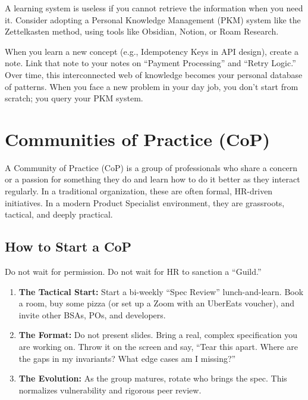 \documentclass[
  11pt,
  openany,
  oneside]{book}
\providecommand{\tightlist}{%
  \setlength{\itemsep}{0pt}\setlength{\parskip}{0pt}}
\begin{document}
A learning system is useless if you cannot retrieve the information when
you need it. Consider adopting a Personal Knowledge Management (PKM)
system like the Zettelkasten method, using tools like Obsidian, Notion,
or Roam Research.

When you learn a new concept (e.g., Idempotency Keys in API design),
create a note. Link that note to your notes on ``Payment Processing''
and ``Retry Logic.'' Over time, this interconnected web of knowledge
becomes your personal database of patterns. When you face a new problem
in your day job, you don't start from scratch; you query your PKM
system.

\bigskip

\section{Communities of Practice
(CoP)}\label{communities-of-practice-cop}

A Community of Practice (CoP) is a group of professionals who share a
concern or a passion for something they do and learn how to do it better
as they interact regularly. In a traditional organization, these are
often formal, HR-driven initiatives. In a modern Product Specialist
environment, they are grassroots, tactical, and deeply practical.

\subsection{How to Start a CoP}\label{how-to-start-a-cop}

Do not wait for permission. Do not wait for HR to sanction a ``Guild.''

\begin{enumerate}
\def\labelenumi{\arabic{enumi}.}
\tightlist
\item
  \textbf{The Tactical Start:} Start a bi-weekly ``Spec Review''
  lunch-and-learn. Book a room, buy some pizza (or set up a Zoom with an
  UberEats voucher), and invite other BSAs, POs, and developers.
\item
  \textbf{The Format:} Do not present slides. Bring a real, complex
  specification you are working on. Throw it on the screen and say,
  ``Tear this apart. Where are the gaps in my invariants? What edge
  cases am I missing?''
\item
  \textbf{The Evolution:} As the group matures, rotate who brings the
  spec. This normalizes vulnerability and rigorous peer review.
\end{enumerate}
\end{document}
